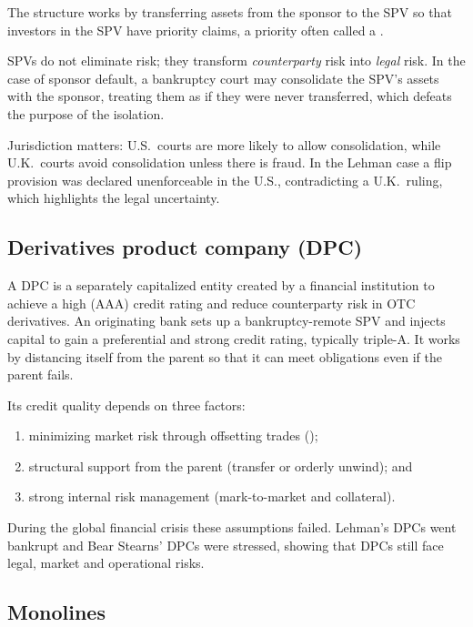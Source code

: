 The structure works by transferring assets from the sponsor to the SPV so that
investors in the SPV have priority claims, a priority often called a .

\begin{crtrapbox}
SPVs do not eliminate risk; they transform \emph{counterparty} risk into
\emph{legal} risk. In the case of sponsor default, a bankruptcy court may
consolidate the SPV's assets with the sponsor, treating them as if they were never
transferred, which defeats the purpose of the isolation.

\smallskip
Jurisdiction matters: U.S.\ courts are more likely to allow consolidation, while
U.K.\ courts avoid consolidation unless there is fraud. In the Lehman case a flip
provision was declared unenforceable in the U.S., contradicting a U.K.\ ruling,
which highlights the legal uncertainty.
\end{crtrapbox}

\subsection*{Derivatives product company (DPC)}

A DPC is a separately capitalized entity created by a financial institution to
achieve a high (AAA) credit rating and reduce counterparty risk in OTC
derivatives. An originating bank sets up a bankruptcy-remote SPV and injects
capital to gain a preferential and strong credit rating, typically triple-A. It
works by distancing itself from the parent so that it can meet obligations even if
the parent fails.

Its credit quality depends on three factors:

\begin{enumerate}[label=\alph*)]
\item minimizing market risk through offsetting trades ();
\item structural support from the parent (transfer or orderly unwind); and
\item strong internal risk management (mark-to-market and collateral).
\end{enumerate}

During the global financial crisis these assumptions failed. Lehman's DPCs went
bankrupt and Bear Stearns' DPCs were stressed, showing that DPCs still face legal,
market and operational risks.

\subsection*{Monolines}


